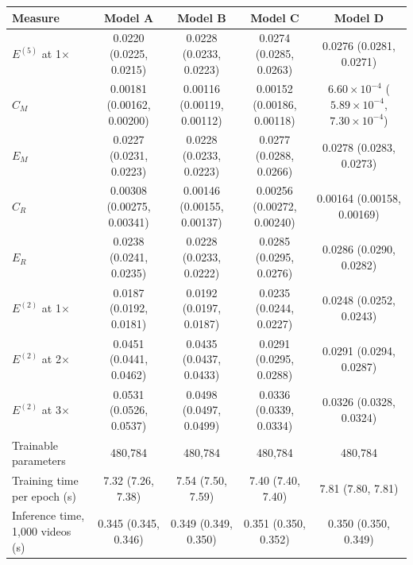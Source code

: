 \begin{tabular}{lcccc}
\toprule
Measure & Model A & Model B & Model C & Model D \\
\midrule
$E^{(5)}$ at 1$\times$ & 0.0220 (0.0225, 0.0215) & 0.0228 (0.0233, 0.0223) & 0.0274 (0.0285, 0.0263) & 0.0276 (0.0281, 0.0271) \\
$C_M$ & 0.00181 (0.00162, 0.00200) & 0.00116 (0.00119, 0.00112) & 0.00152 (0.00186, 0.00118) & $6.60\times10^{-4}$ ($5.89\times10^{-4}$, $7.30\times10^{-4}$) \\
$E_M$ & 0.0227 (0.0231, 0.0223) & 0.0228 (0.0233, 0.0223) & 0.0277 (0.0288, 0.0266) & 0.0278 (0.0283, 0.0273) \\
$C_R$ & 0.00308 (0.00275, 0.00341) & 0.00146 (0.00155, 0.00137) & 0.00256 (0.00272, 0.00240) & 0.00164 (0.00158, 0.00169) \\
$E_R$ & 0.0238 (0.0241, 0.0235) & 0.0228 (0.0233, 0.0222) & 0.0285 (0.0295, 0.0276) & 0.0286 (0.0290, 0.0282) \\
$E^{(2)}$ at 1$\times$ & 0.0187 (0.0192, 0.0181) & 0.0192 (0.0197, 0.0187) & 0.0235 (0.0244, 0.0227) & 0.0248 (0.0252, 0.0243) \\
$E^{(2)}$ at 2$\times$ & 0.0451 (0.0441, 0.0462) & 0.0435 (0.0437, 0.0433) & 0.0291 (0.0295, 0.0288) & 0.0291 (0.0294, 0.0287) \\
$E^{(2)}$ at 3$\times$ & 0.0531 (0.0526, 0.0537) & 0.0498 (0.0497, 0.0499) & 0.0336 (0.0339, 0.0334) & 0.0326 (0.0328, 0.0324) \\
Trainable parameters & 480,784 & 480,784 & 480,784 & 480,784 \\
Training time per epoch (s) & 7.32 (7.26, 7.38) & 7.54 (7.50, 7.59) & 7.40 (7.40, 7.40) & 7.81 (7.80, 7.81) \\
Inference time, 1,000 videos (s) & 0.345 (0.345, 0.346) & 0.349 (0.349, 0.350) & 0.351 (0.350, 0.352) & 0.350 (0.350, 0.349) \\
\bottomrule
\end{tabular}
